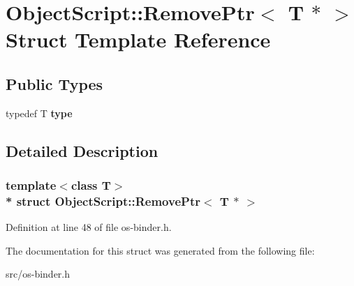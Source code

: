 \hypertarget{struct_object_script_1_1_remove_ptr_3_01_t_01_5_01_4}{}\section{Object\+Script\+:\+:Remove\+Ptr$<$ T $\ast$ $>$ Struct Template Reference}
\label{struct_object_script_1_1_remove_ptr_3_01_t_01_5_01_4}
\subsection*{Public Types}
\begin{DoxyCompactItemize}
\item 
typedef T {\bfseries type}\hypertarget{struct_object_script_1_1_remove_ptr_3_01_t_01_5_01_4_a4f87f71b7681323116560fdb8f87f92c}{}\label{struct_object_script_1_1_remove_ptr_3_01_t_01_5_01_4_a4f87f71b7681323116560fdb8f87f92c}

\end{DoxyCompactItemize}


\subsection{Detailed Description}
\subsubsection*{template$<$class T$>$\\*
struct Object\+Script\+::\+Remove\+Ptr$<$ T $\ast$ $>$}



Definition at line 48 of file os-\/binder.\+h.



The documentation for this struct was generated from the following file\+:\begin{DoxyCompactItemize}
\item 
src/os-\/binder.\+h\end{DoxyCompactItemize}
